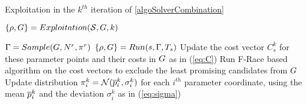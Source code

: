 \begin{algorithm}
\caption{Exploitation in the $k^{th}$ iteration of \ref{algoSolverCombination}}
\caption{$\{ \rho, G \}=Exploitation(\mathcal{S}, G, k)$ \label{algoFRace}}
\begin{algorithmic}
  \State {}
  \State
  \State $\Gamma  = Sample(G, N^{r}, \pi^r)$
   \State
  \ForAll{$\solver \in \solversetRho$} 
    \State
     \State {}    
      \State $\{ \rho, G \} = Run(s, \Gamma, T_{s})$   
      \State 
      \State  Update the cost vector $C_s^k$ for these parameter points and their costs in $G$ as in (\ref{eq:C})
     \EndFor
   \State
   \State Run F-Race based algorithm on the cost vectors to exclude the least promising candidates from $G$   
   \State
  \State Update distribution $\pi_i^k=\mathcal{N}(\overline{p}^k_i, \sigma_i^k)$ for each $i^{th}$ parameter coordinate, using the mean $\overline{p}^k_i$ and the deviation $\sigma^k_i$ as in (\ref{eq:sigma})
\end{algorithmic}
\end{algorithm}



